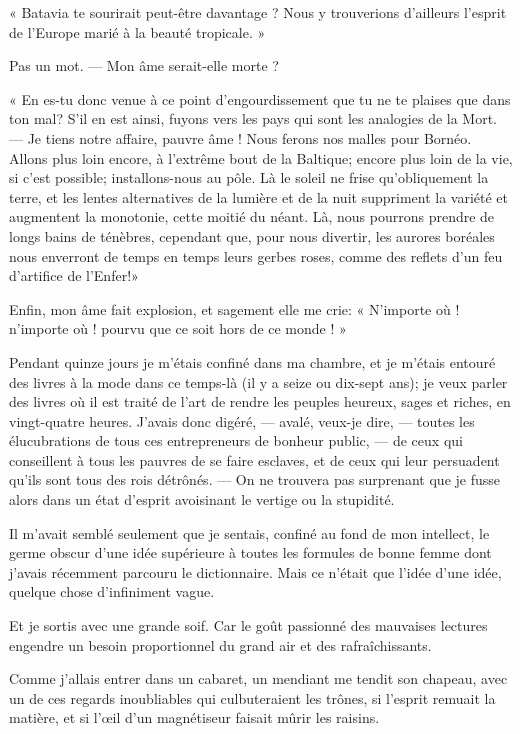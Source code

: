 « Batavia te sourirait peut{}-être davantage ? Nous y trouverions
d’ailleurs l’esprit de
l’Europe marié à la beauté tropicale. »

Pas un mot. --- Mon âme serait{}-elle morte ?

« En es{}-tu donc venue à ce point d’engourdissement
que tu ne te plaises que dans ton mal? S’il en est
ainsi, fuyons vers les pays qui sont les analogies de la Mort. --- Je
tiens notre affaire, pauvre âme ! Nous ferons nos malles pour Bornéo.
Allons plus loin encore, à l’extrême bout de la
Baltique; encore plus loin de la vie, si c’est
possible; installons{}-nous au pôle. Là le soleil ne frise
qu’obliquement la terre, et les lentes alternatives de
la lumière et de la nuit suppriment la variété et augmentent la
monotonie, cette moitié du néant. Là, nous pourrons prendre de longs
bains de ténèbres, cependant que, pour nous divertir, les aurores
boréales nous enverront de temps en temps leurs gerbes roses, comme des
reflets d’un feu d’artifice de
l’Enfer!»

Enfin, mon âme fait explosion, et sagement elle me crie: «
N’importe où ! n’importe où ! pourvu
que ce soit hors de ce monde ! »


Pendant quinze jours je m’étais confiné dans ma
chambre, et je m’étais entouré des livres à la mode
dans ce temps{}-là (il y a seize ou dix{}-sept ans); je veux parler des
livres où il est traité de l’art de rendre les peuples
heureux, sages et riches, en vingt{}-quatre heures.
J’avais donc digéré, --- avalé, veux{}-je dire, --- toutes
les élucubrations de tous ces entrepreneurs de bonheur public, --- de
ceux qui conseillent à tous les pauvres de se faire esclaves, et de
ceux qui leur persuadent qu’ils sont tous des rois
détrônés. --- On ne trouvera pas surprenant que je fusse alors dans un
état d’esprit avoisinant le vertige ou la stupidité.

Il m’avait semblé seulement que je sentais, confiné au
fond de mon intellect, le germe obscur d’une idée
supérieure à toutes les formules de bonne femme dont
j’avais récemment parcouru le dictionnaire. Mais ce
n’était que l’idée
d’une idée, quelque chose
d’infiniment vague.

Et je sortis avec une grande soif. Car le goût passionné des mauvaises
lectures engendre un besoin proportionnel du grand air et des
rafraîchissants.

Comme j’allais entrer dans un cabaret, un mendiant me
tendit son chapeau, avec un de ces regards inoubliables qui
culbuteraient les trônes, si l’esprit remuait la
matière, et si l’\oe il d’un
magnétiseur faisait mûrir les raisins.

